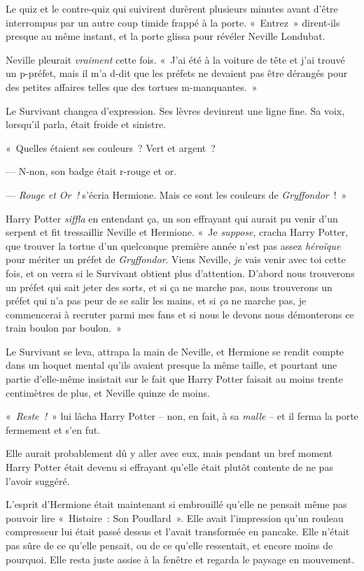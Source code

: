 Le quiz et le contre-quiz qui suivirent durèrent plusieurs minutes avant d'être interrompus par un autre coup timide frappé à la porte. «~Entrez~» dirent-ils presque au même instant, et la porte glissa pour révéler Neville Londubat.

Neville pleurait \emph{vraiment} cette fois. «~J'ai été à la voiture de tête et j'ai trouvé un p-préfet, mais il m'a d-dit que les préfets ne devaient pas être dérangés pour des petites affaires telles que des tortues m-manquantes.~»

Le Survivant changea d'expression. Ses lèvres devinrent une ligne fine. Sa voix, lorsqu'il parla, était froide et sinistre.

«~Quelles étaient ses couleurs~? Vert et argent~?

--- N-non, son badge était r-rouge et or.

--- \emph{Rouge et Or~!} s'écria Hermione. Mais ce sont les couleurs de \emph{Gryffondor}~!~»

Harry Potter \emph{siffla} en entendant ça, un son effrayant qui aurait pu venir d'un serpent et fit tressaillir Neville et Hermione. «~Je \emph{suppose}, cracha Harry Potter, que trouver la tortue d'un quelconque première année n'est pas assez \emph{héroïque} pour mériter un préfet de \emph{Gryffondor}. Viens Neville, \emph{je} vais venir avec toi cette fois, et on verra si le Survivant obtient plus d'attention. D'abord nous trouverons un préfet qui sait jeter des sorts, et si ça ne marche pas, nous trouverons un préfet qui n'a pas peur de se salir les mains, et si \emph{ça} ne marche pas, je commencerai à recruter parmi mes fans et si nous le devons nous démonterons ce train boulon par boulon.~»

Le Survivant se leva, attrapa la main de Neville, et Hermione se rendit compte dans un hoquet mental qu'ils avaient presque la même taille, et pourtant une partie d'elle-même insistait sur le fait que Harry Potter faisait au moins trente centimètres de plus, et Neville quinze de moins.

«~\emph{Reste~!}~» lui lâcha Harry Potter -- non, en fait, à sa \emph{malle} -- et il ferma la porte fermement et s'en fut.

Elle aurait probablement dû y aller avec eux, mais pendant un bref moment Harry Potter était devenu si effrayant qu'elle était plutôt contente de ne pas l'avoir suggéré.

L'esprit d'Hermione était maintenant si embrouillé qu'elle ne pensait même pas pouvoir lire «~Histoire~: Son Poudlard~». Elle avait l'impression qu'un rouleau compresseur lui était passé dessus et l'avait transformée en pancake. Elle n'était pas sûre de ce qu'elle pensait, ou de ce qu'elle ressentait, et encore moins de pourquoi. Elle resta juste assise à la fenêtre et regarda le paysage en mouvement.

